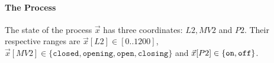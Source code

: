 {%

\paragraph{The Process} 
The state of the process $\vec{x}$ has three coordinates: $L2, MV2$ and $P2$. Their respective ranges are $\vec{x}[L2]\in [0..1200]$, $\vec{x}[MV2]\in \{\texttt{closed},\texttt{opening},\texttt{open},\texttt{closing}\}$ and $\vec{x}[P2]\in \left\{\texttt{on},\texttt{off}\right\}$. 

}
